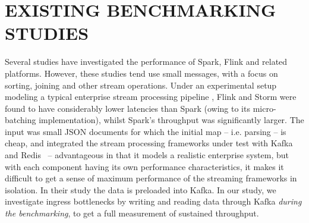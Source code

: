 \documentclass[letterpaper,conference]{IEEEtran}
\begin{document}
\section{EXISTING BENCHMARKING STUDIES}\label{benchmarking}
Several studies have investigated the performance of Spark, Flink and related platforms. However, these studies tend use small messages, with a focus on sorting, joining and other stream operations.  Under an experimental setup modeling a typical enterprise stream processing pipeline \cite{chintapalliBenchmarkingStreamingComputation2016}, Flink and Storm were found to have considerably lower latencies than Spark (owing to its micro-batching implementation), whilst Spark's throughput was significantly larger. The input was small JSON documents for which the initial map -- i.e. parsing -- is cheap, and integrated the stream processing frameworks under test with Kafka~\cite{kreps2011kafka} and Redis~\cite{salvatoresanfilippoRedis2009} -- advantageous in that it models a realistic enterprise system, but with each component having its own performance characteristics, it makes it difficult to get a sense of maximum performance of the streaming frameworks in isolation. In their study the data is preloaded into Kafka. In our study, we investigate ingress bottlenecks by writing and reading data through Kafka \emph{during the benchmarking}, to get a full measurement of sustained throughput.
\end{document}
